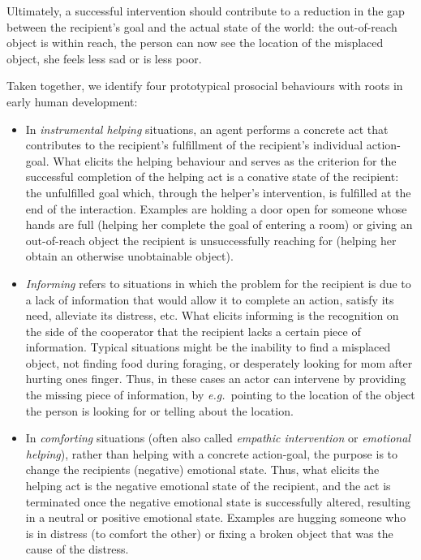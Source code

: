 \documentclass{article}
\newcommand{\eg}{{\textit{e.g.~}}}
\begin{document}
Ultimately, a successful intervention should
contribute to a reduction in the gap between the recipient's goal and the
actual state of the world: the out-of-reach object is within reach, the person
can now see the location of the misplaced object, she feels less sad or is less
poor.

Taken together, we identify four prototypical prosocial behaviours with roots in
early human development: 

\begin{itemize}

\item In \emph{instrumental helping} situations, an agent performs a concrete
act that contributes to the recipient's fulfillment of the recipient's
individual action-goal. What elicits the helping behaviour and serves as the
criterion for the successful completion of the helping act is a conative state
of the recipient: the unfulfilled goal which, through the helper's
intervention, is fulfilled at the end of the interaction. Examples are holding a
door open for someone whose hands are full (helping her complete the goal of
entering a room) or giving an out-of-reach object the recipient is
unsuccessfully reaching for (helping her obtain an otherwise unobtainable
object).

\item \emph{Informing} refers to situations in which the problem for the
recipient is due to a lack of information that would allow it to complete an
action, satisfy its need, alleviate its distress, etc. What elicits informing
is the recognition on the side of the cooperator that the recipient lacks a
certain piece of information. Typical situations might be the inability to find
a misplaced object, not finding food during foraging, or desperately looking
for mom after hurting ones finger. Thus, in these cases an actor can intervene
by providing the missing piece of information, by \eg pointing to the
location of the object the person is looking for or telling about the
location.

\item In \textit{comforting} situations (often also called \emph{empathic
intervention} or \emph{emotional helping}), rather than helping with a concrete
action-goal, the purpose is to change the recipients (negative) emotional
state. Thus, what elicits the helping act is the negative emotional state of
the recipient, and the act is terminated once the negative emotional state is
successfully altered, resulting in a neutral or positive emotional state.
Examples are hugging someone who is in distress (to comfort the other) or
fixing a broken object that was the cause of the distress.


\end{itemize}
\end{document}
